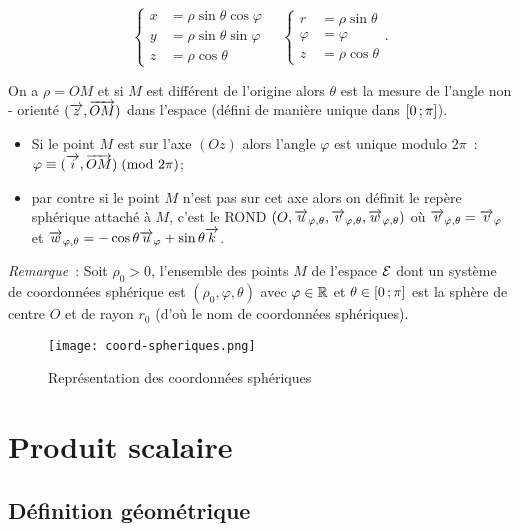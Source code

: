 \begin{equation}
  \begin{cases}
    x &= \rho\sin\theta\cos\varphi\\
    y &= \rho\sin\theta\sin\varphi\\ z &= \rho\cos\theta
  \end{cases}
  \quad
  \begin{cases}
    r & = \rho\sin\theta\\ \varphi& = \varphi\\ z& = \rho\cos\theta
  \end{cases}.
\end{equation}

On a \(\rho = OM\) et si \(M\) est différent de l'origine alors \(\theta\) est 
la mesure de l'angle non - orienté \((\overrightarrow{z},\overrightarrow{OM})\) dans l'espace 
(défini de manière unique dans \(\left[ 0 \, ; {} \pi \right]\)).
\begin{itemize}
  \item Si le point \(M\) est sur l'axe \((Oz)\) alors l'angle \(\varphi\) est 
    unique modulo \(2\pi\)~: \(\varphi \equiv (\overrightarrow{i}, \overrightarrow{OM})\!\pmod {2\pi}\);
  \item par contre si le point \(M\) n'est pas sur cet axe alors on définit le 
    repère sphérique attaché à \(M\), c'est le ROND \((O, \overrightarrow{u}_{\varphi, 
    \theta},\overrightarrow{v}_{\varphi, \theta},\overrightarrow{w}_{\varphi, \theta})\) où \(\overrightarrow{v}_{\varphi, 
    \theta} = \overrightarrow{v}_{\varphi}\) et \(\overrightarrow{w}_{\varphi, \theta} = 
    -\cos\theta\overrightarrow{u}_\varphi + \sin\theta\overrightarrow{k}\).
\end{itemize}

\emph{Remarque}~: Soit \(\rho_0>0\), l'ensemble des points \(M\) de l'espace 
\(\mathcal{E}\) dont un système de coordonnées sphérique est \((\rho_0, \varphi, 
\theta)\) avec \(\varphi\in\mathbb{R}\) et \(\theta\in \left[ 0 \, ; {} \pi \right]\) est la 
sphère de centre \(O\) et de rayon \(r_0\) (d'où le nom de coordonnées 
sphériques).

\begin{figure}
  \centering
  \texttt{[image: coord-spheriques.png]}
  \caption{Représentation des coordonnées sphériques}
  \label{fig:repsphere}
\end{figure}

\section{Produit scalaire}

\subsection{Définition géométrique}

